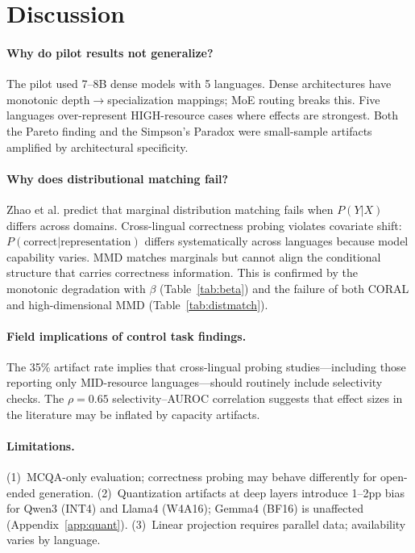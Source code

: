 \documentclass[11pt,a4paper]{article}
\begin{document}
\section{Discussion}
\label{sec:discussion}

\paragraph{Why do pilot results not generalize?}
The pilot used 7--8B dense models with 5 languages.
Dense architectures have monotonic depth$\to$specialization mappings; MoE routing breaks this.
Five languages over-represent HIGH-resource cases where effects are strongest.
Both the Pareto finding and the Simpson's Paradox were small-sample artifacts amplified by architectural specificity.

\paragraph{Why does distributional matching fail?}
Zhao et al. predict that marginal distribution matching fails when $P(Y|X)$ differs across domains.
Cross-lingual correctness probing violates covariate shift: $P(\text{correct}|\text{representation})$ differs systematically across languages because model capability varies.
MMD matches marginals but cannot align the conditional structure that carries correctness information.
This is confirmed by the monotonic degradation with $\beta$ (Table~\ref{tab:beta}) and the failure of both CORAL and high-dimensional MMD (Table~\ref{tab:distmatch}).

\paragraph{Field implications of control task findings.}
The 35\% artifact rate implies that cross-lingual probing studies---including those reporting only MID-resource languages---should routinely include selectivity checks.
The $\rho{=}0.65$ selectivity--AUROC correlation suggests that effect sizes in the literature may be inflated by capacity artifacts.

\paragraph{Limitations.}
(1)~MCQA-only evaluation; correctness probing may behave differently for open-ended generation.
(2)~Quantization artifacts at deep layers introduce 1--2pp bias for Qwen3 (INT4) and Llama4 (W4A16); Gemma4 (BF16) is unaffected (Appendix~\ref{app:quant}).
(3)~Linear projection requires parallel data; availability varies by language.
\end{document}
